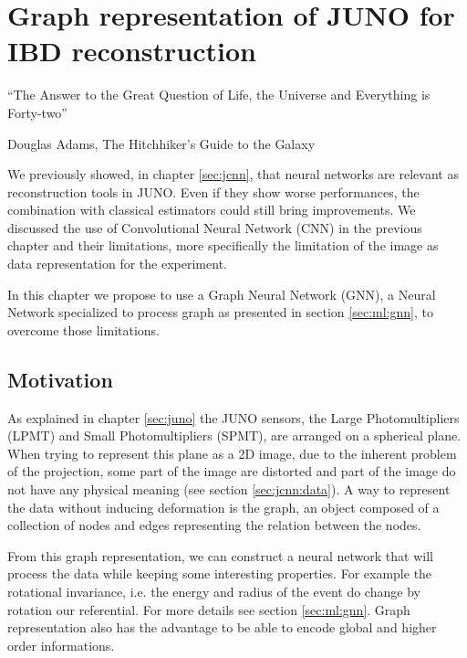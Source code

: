 \documentclass[../main.tex]{subfiles}
\begin{document}
\chapter{Graph representation of JUNO for IBD reconstruction}
\epigraph{``The Answer to the Great Question of Life, the Universe and Everything is Forty-two''}{Douglas Adams, The Hitchhiker’s Guide to the Galaxy}
\label{sec:jgnn}

We previously showed, in chapter \ref{sec:jcnn}, that neural networks are relevant as reconstruction tools in JUNO. Even if they show worse performances, the combination with classical estimators could still bring improvements. We discussed the use of Convolutional Neural Network (CNN) in the previous chapter and their limitations, more specifically the limitation of the image as data representation for the experiment.

In this chapter we propose to use a Graph Neural Network (GNN), a Neural Network specialized to process graph as presented in section \ref{sec:ml:gnn}, to overcome those limitations.

\section{Motivation}
\label{sec:jgnn:motiv}

As explained in chapter \ref{sec:juno} the JUNO sensors, the Large Photomultipliers (LPMT) and Small Photomultipliers (SPMT), are arranged on a spherical plane. When trying to represent this plane as a 2D image, due to the inherent problem of the projection, some part of the image are distorted and part of the image do not have any physical meaning (see section  \ref{sec:jcnn:data}). A way to represent the data without inducing deformation is the graph, an object composed of a collection of nodes and edges representing the relation between the nodes.

From this graph representation, we can construct a neural network that will process the data while keeping some interesting properties. For example the rotational invariance, i.e. the energy and radius of the event do change by rotation our referential. For more details see section \ref{sec:ml:gnn}. Graph representation also has the advantage to be able to encode global and higher order informations.
\end{document}
